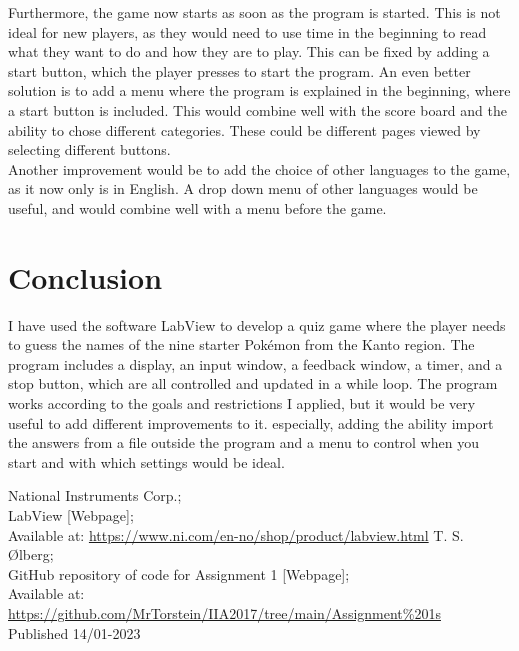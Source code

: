 \documentclass[11pt, A4paper, english]{article}
\begin{document}
Furthermore, the game now starts as soon as the program is started. This is not ideal for new players, as they would need to use time in the beginning to read what they want to do and how they are to play. This can be fixed by adding a start button, which the player presses to start the program. An even better solution is to add a menu where the program is explained in the beginning, where a start button is included. This would combine well with the score board and the ability to chose different categories. These could be different pages viewed by selecting different buttons. \\

Another improvement would be to add the choice of other languages to the game, as it now only is in English. A drop down menu of other languages would be useful, and would combine well with a menu before the game.

	\section{Conclusion}
I have used the software LabView to develop a quiz game where the player needs to guess the names of the nine starter Pokémon from the Kanto region. The program includes a display, an input window, a feedback window, a timer, and a stop button, which are all controlled and updated in a while loop. The program works according to the goals and restrictions I applied, but it would be very useful to add different improvements to it. especially, adding the ability import the answers from a file outside the program and a menu to control when you start and with which settings would be ideal.

		\begin{thebibliography}{9}
National Instruments Corp.; \\
LabView [Webpage]; \\
Available at: \url{https://www.ni.com/en-no/shop/product/labview.html}
T. S. Ølberg; \\
GitHub repository of code for Assignment 1 [Webpage]; \\
Available at: \url{https://github.com/MrTorstein/IIA2017/tree/main/Assignment\%201s} \\
Published 14/01-2023
		\end{thebibliography}
\end{document}
